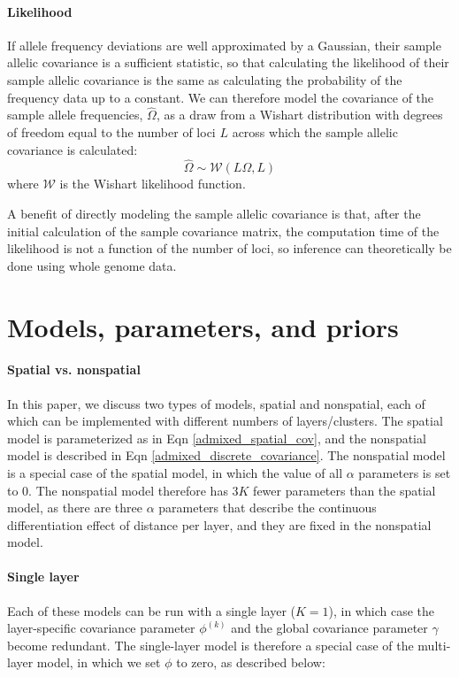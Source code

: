 \documentclass[12pt]{article}
\begin{document}
\paragraph{Likelihood}
If allele frequency deviations are well approximated by a Gaussian, 
their sample allelic covariance is a sufficient statistic,
so that calculating the likelihood of their sample allelic covariance is the same as 
calculating the probability of the frequency data up to a constant. 
We can therefore model the covariance of the sample allele frequencies, $\widehat{\Omega}$, 
as a draw from a Wishart distribution with degrees of freedom equal to 
the number of loci $L$ across which the sample allelic covariance is calculated:
\begin{equation}
\widehat{\Omega} \sim \mathcal{W}\left( L\Omega, L	\right) 
\label{wishart}
\end{equation}
where $\mathcal{W}$ is the Wishart likelihood function.

A benefit of directly modeling the sample allelic covariance is that, 
after the initial calculation of the sample covariance matrix,
the computation time of the likelihood is not a function of the number of loci,
so inference can theoretically be done using whole genome data.


\section{Models, parameters, and priors}\label{model_app}
\paragraph{Spatial vs. nonspatial}
In this paper, we discuss two types of models, spatial and nonspatial, 
each of which can be implemented with different numbers of layers/clusters.
The spatial model is parameterized as in Eqn \eqref{admixed_spatial_cov},
and the nonspatial model is described in Eqn \eqref{admixed_discrete_covariance}.
The nonspatial model is a special case of the spatial model, 
in which the value of all $\alpha$ parameters is set to 0.
The nonspatial model therefore has $3K$ fewer parameters than the spatial model,
as there are three $\alpha$ parameters that describe the continuous differentiation effect of distance per layer,
and they are fixed in the nonspatial model.

\paragraph{Single layer}
Each of these models can be run with a single layer ($K=1$), 
in which case the layer-specific covariance parameter $\phi^{(k)}$ 
and the global covariance parameter $\gamma$ become redundant.
The single-layer model is therefore a special case of the multi-layer model, 
in which we set $\phi$ to zero, as described below:
\end{document}
